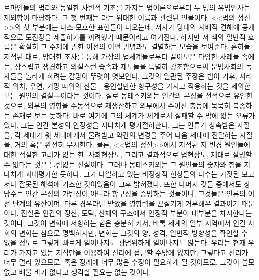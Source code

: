 로마인들의 법리와 동일한 사변적 기초를 가지는 법이론으로부터
두 명의 유명인사는 제외함이 마땅하다.
그 첫 번째는 라는 위대한 이름과 관련된 인물이다.
<<법의 정신>>의 첫 부분에는 다소 모호한 표현들이 나오는데,
저자가 당대의 지배적 견해에 공개적으로 도전장을 제출하기를 꺼려했기
때문이라고 여겨진다.
하지만 저 책의 일반적 흐름은 확실히 그 주제에 관한 이전의 어떤 관념과도
결별하는 모습을 보여준다.
흔히들 지적된 대로,
방대한 조사를 통해 가상의 법체계들로부터 끌어모은 다양한 사례들 속에는,
상스럽고 생경하고 외설스런 습속과 제도들을 특별히 강조함으로써
문명사회의 독자들을 놀라게 하려는 갈망이 뚜렷이 엿보인다.
그것의 일관된 주장은 법이 기후, 지리적 위치, 우연, 기망 따위의
산물---용인할만한 항구성을 가지고 작용하는 것을 제외한 모든 원인의
결실---이라는 것이다.
실로 몽테스키외는 인간의 본성을 전적으로 유연한 것으로,
외부의 영향을 수동적으로 재생산하고 외부에서 주어진 충동에 묵묵히 복종하는
존재로 보는 듯하다.
바로 여기에 그의 체계가 체계로서 실패할 수 밖에 없는 오류가 있다.
그는 인간 본성의 안정성을 지나치게 평가절하한다.
그는 인류가 상속받은 자질을,
각 세대가 윗 세대에게서 물려받고 약간의 변경을 주어 다음 세대에
전달하는 자질을,
거의 혹은 완전히 무시한다.
물론, <<법의 정신>>에서 지적된 저 변경 원인들에 대한 적절한 고려가
없는 한, 사회현상도, 그리고 결과적으로 법현상도, 제대로 설명할 수 없다는
것은 틀림없는 진실이다.
그러나 몽테스키외는 그 원인들의 숫자와 힘을 지나치게 과대평가한 듯하다.
그가 나열하고 있는 비정상적 현상들의 다수는 거짓된 보고서나
잘못된 해석에 기초한 것이었음이 그후 밝혀졌다.
또한 나머지 것들 중에서도 상당수는 인간 본성의 가변성이 아니라
항구성을 증명하는 것들이니,
그것들은 인류의 이전 단계의 유산이며,
다른 경우라면 받았을 영향력을 끈질기게 거부해온
결과이기 때문이다.
진실은 인간의 정신, 도덕, 신체의 구조에서 안정적 부분이 대부분을
차지한다는 것이다.
그것이 변화에 저항하는 힘은 충분히 커서,
비록 세계의 일부 지역에서 인간 사회의 변화는 참으로 명백하지만,
변화는 그것의 양, 성격, 일반적 방향성을 확인할 수 없을 정도로
그렇게 빠르게 일어나지도 광범위하게 일어나지도 않는다.
우리는
현재 우리가 가지고 있는 지식만을 이용하여 진리에 접근할 수밖에 없지만,
그렇다고
진리가 너무 멀리 있으므로, 혹은 
장래에 너무 많은 수정이 필요하게 될 것이므로,
그것이 쓸모없고 배울 바가 없다고 생각할 필요는 없는 것이다.

